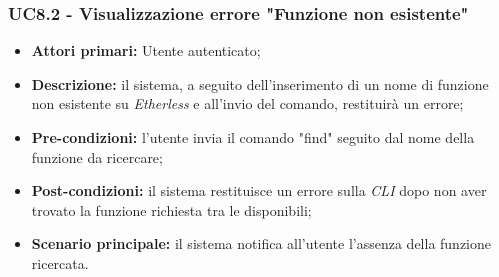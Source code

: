 \subsubsection{UC8.2 - Visualizzazione errore "Funzione non esistente"}
\begin{itemize}
	\item \textbf{Attori primari:} Utente autenticato;
	\item \textbf{Descrizione:} il sistema, a seguito dell'inserimento di un nome di funzione non esistente su \textit{Etherless} e all'invio del comando, restituirà un errore; 
	\item \textbf{Pre-condizioni:} l'utente invia il comando "find" seguito dal nome della funzione da ricercare;
	\item \textbf{Post-condizioni:} il sistema restituisce un errore sulla \textit{CLI\glo} dopo non aver trovato la funzione richiesta tra le disponibili;
	\item \textbf{Scenario principale:} il sistema notifica all'utente l'assenza della funzione ricercata.
\end{itemize}